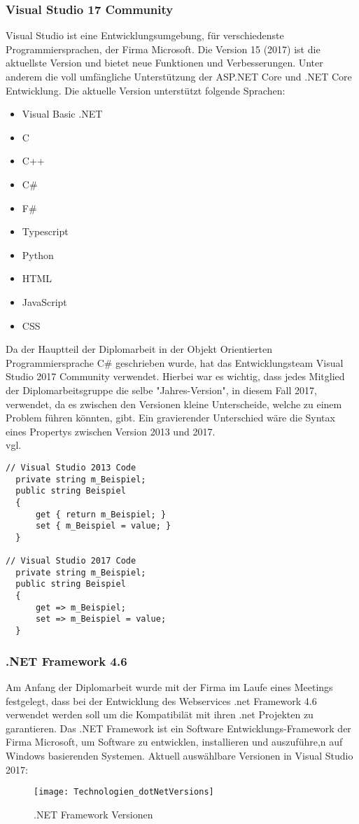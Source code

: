 \subsubsection{Visual Studio 17 Community}
\label{sec:VisualStudio17Community}
Visual Studio ist eine Entwicklungsumgebung, für verschiedenste Programmiersprachen, der Firma Microsoft. Die Version 15 (2017) ist die aktuellste Version und bietet neue Funktionen und Verbesserungen. Unter anderem die voll umfängliche Unterstützung der ASP.NET Core und .NET Core Entwicklung. Die aktuelle Version unterstützt folgende Sprachen:
\begin{itemize}
\item Visual Basic .NET
\item C
\item C++
\item C\#
\item F\#
\item Typescript
\item Python
\item HTML
\item JavaScript
\item CSS
\end{itemize}
Da der Hauptteil der Diplomarbeit in der Objekt Orientierten Programmiersprache C\# geschrieben wurde, hat das Entwicklungsteam Visual Studio 2017 Community verwendet. Hierbei war es wichtig, dass jedes Mitglied der Diplomarbeitsgruppe die selbe "Jahres-Version", in diesem Fall 2017, verwendet, da es zwischen den Versionen kleine Unterscheide, welche zu einem Problem führen könnten, gibt. Ein gravierender Unterschied wäre die Syntax eines Propertys zwischen Version 2013 und 2017. \\vgl. \cite{visualstudio}
\begin{lstlisting}[caption=Syntax Unterschied: Property , label=lst:test]
// Visual Studio 2013 Code
  private string m_Beispiel;
  public string Beispiel
  {
      get { return m_Beispiel; }
      set { m_Beispiel = value; }
  }

// Visual Studio 2017 Code
  private string m_Beispiel;
  public string Beispiel
  {
      get => m_Beispiel;
      set => m_Beispiel = value;
  }
\end{lstlisting}

\subsubsection{.NET Framework 4.6}
\label{sec:.NETFramework4.6}
Am Anfang der Diplomarbeit wurde mit der Firma im Laufe eines Meetings festgelegt, dass bei der Entwicklung des Webservices .net Framework 4.6 verwendet werden soll um die Kompatibilät mit ihren .net Projekten zu garantieren.
Das .NET Framework ist ein Software Entwicklungs-Framework der Firma Microsoft, um Software zu entwicklen, installieren und auszuführe,n auf Windows basierenden Systemen. 
Aktuell auswählbare Versionen in Visual Studio 2017:\\ 
\begin{figure}[H]
	\centering
    \texttt{[image: Technologien\_dotNetVersions]}
    \caption{.NET Framework Versionen}
    \label{fig:netFramework}
\end{figure}
\justifying

